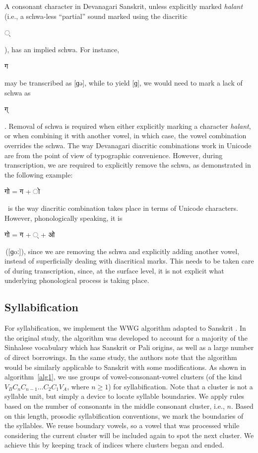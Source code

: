 \documentclass[10pt,a4paper]{article}
\newcommand{\sansk}[1]{\begin{sanskrit}#1\end{sanskrit}}
\begin{document}
A consonant character in Devanagari Sanskrit, unless explicitly marked {\it halant} (i.e., a schwa-less ``partial'' sound marked using the diacritic \sansk{्}), has an implied schwa. For instance, \sansk{ग} may be transcribed as [ɡə], while to yield [ɡ], we would need to mark a lack of schwa as \sansk{ग्}. Removal of schwa is required when either explicitly marking a character {\it halant}, or when combining it with another vowel, in which case, the vowel combination overrides the schwa. The way Devanagari diacritic combinations work in Unicode are from the point of view of typographic convenience. However, during transcription, we are required to explicitly remove the schwa, as demonstrated in the following example:
\sansk{गो = ग  +  ो}  $\,$ is the way diacritic combination takes place in terms of Unicode characters. However, phonologically speaking, it is $\,$
\sansk{गो = ग + ् + ओ} $\,$([ɡoː]), since we are removing the schwa and explicitly adding another vowel, instead of superficially dealing with diacritical marks. This needs to be taken care of during transcription, since, at the surface level, it is not explicit what underlying phonological process is taking place.


\subsection{Syllabification}

For syllabification, we implement the WWG algorithm \cite{weerasinghe2005rule} adapted to Sanskrit \cite{gdasa2013sanskritSyllabification}. In the original study, the algorithm was developed to account for a majority of the Sinhalese vocabulary which has Sanskrit or Pali origins, as well as a large number of direct borrowings. In the same study, the authors note that the algorithm would be similarly applicable to Sanskrit with some modifications.
As shown in algorithm~\ref{alg1}, we use groups of vowel-consonant-vowel clusters (of the kind $V_BC_nC_{n-1}\dots C_2C_1V_A$, where $n\geq1$) for syllabification. Note that a cluster is not a syllable unit, but simply a device to locate syllable boundaries. We apply rules based on the number of consonants in the middle consonant cluster, i.e., $n$. Based on this length, prosodic syllabification conventions, we mark the boundaries of the syllables.
We reuse boundary vowels, so a vowel that was processed while considering the current cluster will be included again to spot the next cluster. We achieve this by keeping track of indices where clusters began and ended.
\end{document}
